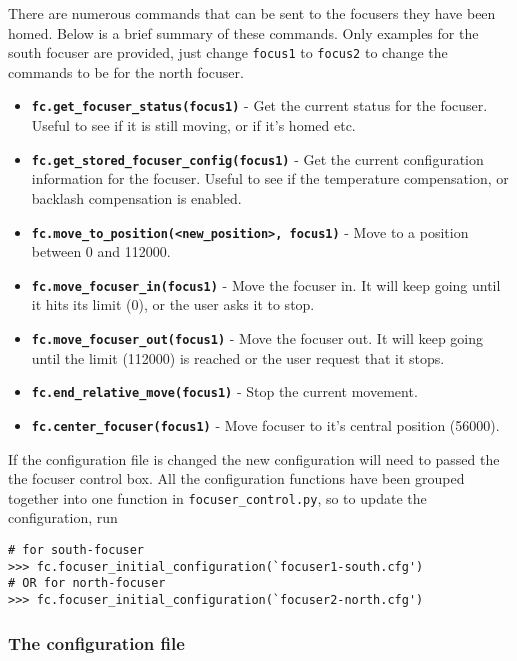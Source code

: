 \documentclass[a4paper,12pt]{article}
\begin{document}
There are numerous commands that can be sent to the focusers they have been homed. Below is a brief summary of these commands. Only examples for the south focuser are provided, just change {\tt focus1} to {\tt focus2} to change the commands to be for the north focuser.
\begin{itemize}
\item{{\bf \tt fc.get\_focuser\_status(focus1)} - Get the current status for the focuser. Useful to see if it is still moving, or if it's homed etc.}
\item{{\bf \tt fc.get\_stored\_focuser\_config(focus1)} - Get the current configuration information for the focuser. Useful to see if the temperature compensation, or backlash compensation is enabled.}
\item{{\bf \tt fc.move\_to\_position(<new\_position>, focus1)} - Move to a position between 0 and 112000.}
\item{{\bf \tt fc.move\_focuser\_in(focus1)} - Move the focuser in. It will keep going until it hits its limit (0), or the user asks it to stop.}
\item{{\bf \tt fc.move\_focuser\_out(focus1)} - Move the focuser out. It will keep going until the limit (112000) is reached or the user request that it stops.}
\item{{\bf \tt fc.end\_relative\_move(focus1)} - Stop the current movement.}
\item{{\bf \tt fc.center\_focuser(focus1)} - Move focuser to it's central position (56000).}
\end{itemize}

If the configuration file is changed the new configuration will need to passed the the focuser control box. All the configuration functions have been grouped together into one function in {\tt focuser\_control.py}, so to update the configuration, run
\begin{verbatim}
# for south-focuser
>>> fc.focuser_initial_configuration(`focuser1-south.cfg') 
# OR for north-focuser
>>> fc.focuser_initial_configuration(`focuser2-north.cfg') 
\end{verbatim}

\subsubsection{The configuration file}
\label{subsubsec:configFocus}
\end{document}
